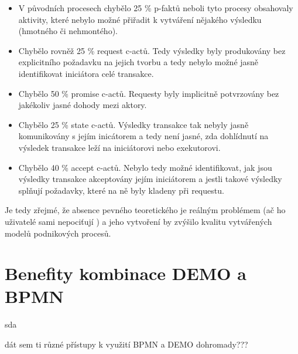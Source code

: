 \documentclass[]{article}
\begin{document}
\begin{itemize}
\item V původních procesech chybělo 25 \% p-faktů neboli tyto procesy obsahovaly aktivity, které nebylo možné přiřadit k vytváření nějakého výsledku (hmotného či nehmontého).
\item Chybělo rovněž 25 \% request c-actů. Tedy výsledky byly produkovány bez explicitního požadavku na jejich tvorbu a tedy nebylo možné jasně identifikovat iniciátora celé transakce.
\item Chybělo 50 \% promise c-actů. Requesty byly implicitně potvrzovány bez jakékoliv jasné dohody mezi aktory.
\item Chybělo 25 \% state c-actů. Výsledky transakce tak nebyly jasně komunikovány s jejím inicátorem a tedy není jasné, zda dohlídnutí na výsledek transakce leží na iniciátorovi nebo exekutorovi.
\item Chybělo 40 \% accept c-actů. Nebylo tedy možné identifikovat, jak jsou výsledky transakce akceptovány jejím iniciátorem a jestli takové výsledky splňují požadavky, které na ně byly kladeny při requestu.
\end{itemize}

Je tedy zřejmé, že absence pevného teoretického je reálným problémem (ač ho uživatelé sami nepociťují \cite{VanNuffel2009}) a jeho vytvoření by zvýšilo kvalitu vytvářených modelů podnikových procesů.

\section{Benefity kombinace DEMO a BPMN}
sda


dát sem ti různé přístupy k využití BPMN a DEMO dohromady???
\nocite{*}


\end{document}
